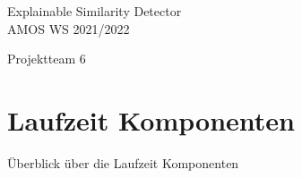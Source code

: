 
\clearmainofpairofpagestyles

\begin{center}
    \vspace*{2cm}
    \Huge{Explainable Similarity Detector}\\

    \vspace*{0.3cm}
    \huge{AMOS WS 2021/2022}

    \vspace*{1.5cm}
    \large{Projektteam 6}

    \vspace*{0.5cm}
    \normalfont{\todayGer}
\end{center}

\vspace*{\fill}

\renewcommand{\contentsname}{Inhaltsverzeichnis}
\tableofcontents

\vspace*{\fill}

\newpage



\cfoot[]{\pagemark}
\ofoot{\todayGer}

\section{Laufzeit Komponenten}


Überblick über die Laufzeit Komponenten

\vspace*{\fill}

